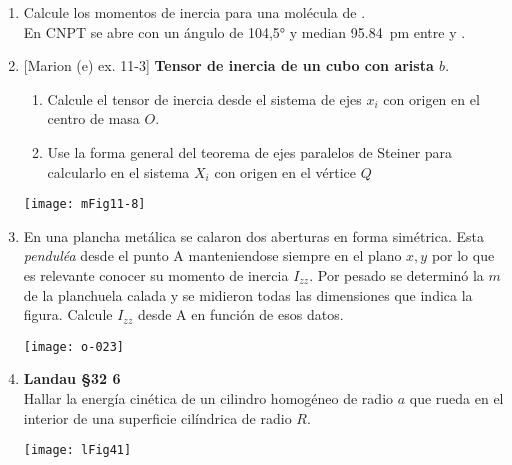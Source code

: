 \documentclass[11pt, spanish, a4paper, twoside]{article}
\begin{document}
\begin{enumerate}
	\item Calcule los momentos de inercia para una molécula de .\\
		En CNPT se abre con un ángulo de \ang{104,5;;} y median \SI{95.84}{\pico\metre} entre  y .



	\item 
		\begin{minipage}[t][3.7cm]{0.6\textwidth}
			[Marion (e) ex. 11-3] \textbf{Tensor de inercia de un cubo con arista \(b\)}.
				\begin{enumerate}
					\item Calcule el tensor de inercia desde el sistema de ejes \(x_i\) con origen en el centro de masa \(O\).
					\item Use la forma general del teorema de ejes paralelos de Steiner para calcularlo en el sistema \(X_i\) con origen en el vértice \(Q\) 
				\end{enumerate}
			\end{minipage}
			\begin{minipage}[c][1.2cm][t]{0.35\textwidth}
				\texttt{[image: mFig11-8]}
			\end{minipage}


		\item 
			\begin{minipage}[t][3.5cm]{0.5\textwidth}
				En una plancha metálica se calaron dos aberturas en forma simétrica.
				Esta \emph{penduléa} desde el punto A manteniendose siempre en el plano \(x,y\) por lo que es relevante conocer su momento de inercia \(I_{zz}\).
				Por pesado se determinó la $m$ de la planchuela calada y se midieron todas las dimensiones que indica la figura.
				Calcule \(I_{zz}\) desde A en función de esos datos.
			\end{minipage}
			\begin{minipage}[c][1.5cm][t]{0.45\textwidth}
				\texttt{[image: o-023]}
			\end{minipage}


		\item 
			\begin{minipage}[t][1.3cm]{0.65\textwidth}
				\textbf{Landau \S 32 6}\\%
				Hallar la energía cinética de un cilindro homogéneo de radio \(a\) que rueda en el interior de una superficie cilíndrica de radio \(R\).
			\end{minipage}
			\begin{minipage}[c][1.5cm][t]{0.3\textwidth}
				\texttt{[image: lFig41]}
			\end{minipage}




\end{enumerate}
\end{document}
